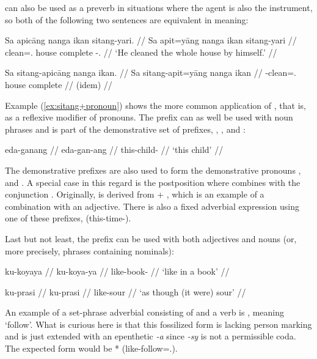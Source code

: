  can also be used as a preverb in situations where the 
agent is also the instrument, so both of the following two sentences are 
equivalent in meaning:

\pex
\a\label{ex:sitang+pronoun}\begingl
	\gla Sa apicāng nanga ikan sitang-yari. //
	\glb Sa apit=yāng nanga ikan sitang-yari //
	\glc \PatT{} clean=\Tsg{}.\Aarg{} house complete 
		\Refl{}-\TsgM{}.\Ins{} //
	\glft `He cleaned the whole house by himself.' //
\endgl

\a\begingl
	\gla Sa sitang-apicāng nanga ikan. //
	\glb Sa sitang-apit=yāng nanga ikan //
	\glc \PatT{} \Refl{}-clean=\Tsg{}.\Aarg{} house complete //
	\glft (idem) //
\endgl
\xe

\label{nounprefixes}
Example (\ref{ex:sitang+pronoun}) shows the more common application of 
, that is, as a reflexive modifier of pronouns. The 
prefix  can as well be used with noun phrases and is part of the 
demonstrative set of prefixes, , , 
and :

\ex\begingl
	\gla eda-ganang //
	\glb eda-gan-ang //
	\glc this-child-\Aarg{} //
	\glft `this child' //
\endgl\xe

The demonstrative prefixes are also used to form the demonstrative 
pronouns , 
 and . A special case 
in this regard is the postposition  where  combines with the conjunction 
. Originally, 
 is derived from  + 
, which is an example of a combination 
with an adjective. There is also a fixed adverbial expression using one of 
these prefixes,  
(this-time-\Dat{}).

Last but not least, the prefix  can be used 
with both adjectives and nouns (or, more precisely, phrases containing 
nominals):

\pex
\a\begingl
	\gla ku-koyaya //
	\glb ku-koya-ya //
	\glc like-book-\Loc{} //
	\glft `like in a book' //
\endgl

\a\begingl
	\gla ku-prasi //
	\glb ku-prasi //
	\glc like-sour //
	\glft `as though (it were) sour' //
\endgl
\xe

An example of a set-phrase adverbial consisting of  and a verb 
is ,  meaning `follow'. 
What is curious here is that this fossilized form is lacking person marking 
and is just extended with an epenthetic \textit{-a} since \textit{-sy} is not 
a permissible coda. The expected form would be 
* (like-follow=\TsgI{}.\Aarg{}).

